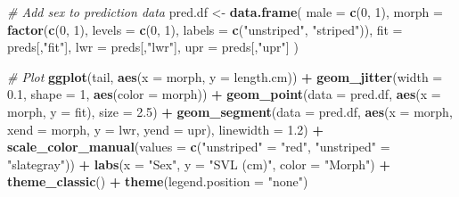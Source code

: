 \documentclass[
]{book}
\newenvironment{Shaded}{\begin{snugshade}}{\end{snugshade}}
\newcommand{\AttributeTok}[1]{\textcolor[rgb]{0.13,0.29,0.53}{#1}}
\newcommand{\CommentTok}[1]{\textcolor[rgb]{0.56,0.35,0.01}{\textit{#1}}}
\newcommand{\DecValTok}[1]{\textcolor[rgb]{0.00,0.00,0.81}{#1}}
\newcommand{\FloatTok}[1]{\textcolor[rgb]{0.00,0.00,0.81}{#1}}
\newcommand{\FunctionTok}[1]{\textcolor[rgb]{0.13,0.29,0.53}{\textbf{#1}}}
\newcommand{\NormalTok}[1]{#1}
\newcommand{\OtherTok}[1]{\textcolor[rgb]{0.56,0.35,0.01}{#1}}
\newcommand{\SpecialCharTok}[1]{\textcolor[rgb]{0.81,0.36,0.00}{\textbf{#1}}}
\newcommand{\StringTok}[1]{\textcolor[rgb]{0.31,0.60,0.02}{#1}}
\begin{document}
\begin{Shaded}
\begin{Highlighting}[]
\CommentTok{\# Add sex to prediction data}
\NormalTok{pred.df }\OtherTok{\textless{}{-}} \FunctionTok{data.frame}\NormalTok{(}
  \AttributeTok{male =} \FunctionTok{c}\NormalTok{(}\DecValTok{0}\NormalTok{, }\DecValTok{1}\NormalTok{),}
  \AttributeTok{morph =} \FunctionTok{factor}\NormalTok{(}\FunctionTok{c}\NormalTok{(}\DecValTok{0}\NormalTok{, }\DecValTok{1}\NormalTok{), }\AttributeTok{levels =} \FunctionTok{c}\NormalTok{(}\DecValTok{0}\NormalTok{, }\DecValTok{1}\NormalTok{), }\AttributeTok{labels =} \FunctionTok{c}\NormalTok{(}\StringTok{"unstriped"}\NormalTok{, }\StringTok{"striped"}\NormalTok{)),}
  \AttributeTok{fit =}\NormalTok{ preds[,}\StringTok{"fit"}\NormalTok{],}
  \AttributeTok{lwr =}\NormalTok{ preds[,}\StringTok{"lwr"}\NormalTok{],}
  \AttributeTok{upr =}\NormalTok{ preds[,}\StringTok{"upr"}\NormalTok{]}
\NormalTok{)}

\CommentTok{\# Plot}
\FunctionTok{ggplot}\NormalTok{(tail, }\FunctionTok{aes}\NormalTok{(}\AttributeTok{x =}\NormalTok{ morph, }\AttributeTok{y =}\NormalTok{ length.cm)) }\SpecialCharTok{+}
  \FunctionTok{geom\_jitter}\NormalTok{(}\AttributeTok{width =} \FloatTok{0.1}\NormalTok{, }\AttributeTok{shape =} \DecValTok{1}\NormalTok{, }\FunctionTok{aes}\NormalTok{(}\AttributeTok{color =}\NormalTok{ morph)) }\SpecialCharTok{+}
  \FunctionTok{geom\_point}\NormalTok{(}\AttributeTok{data =}\NormalTok{ pred.df, }\FunctionTok{aes}\NormalTok{(}\AttributeTok{x =}\NormalTok{ morph, }\AttributeTok{y =}\NormalTok{ fit), }\AttributeTok{size =} \FloatTok{2.5}\NormalTok{) }\SpecialCharTok{+}
  \FunctionTok{geom\_segment}\NormalTok{(}\AttributeTok{data =}\NormalTok{ pred.df,}
               \FunctionTok{aes}\NormalTok{(}\AttributeTok{x =}\NormalTok{ morph, }\AttributeTok{xend =}\NormalTok{ morph, }\AttributeTok{y =}\NormalTok{ lwr, }\AttributeTok{yend =}\NormalTok{ upr), }\AttributeTok{linewidth =} \FloatTok{1.2}\NormalTok{) }\SpecialCharTok{+}
  \FunctionTok{scale\_color\_manual}\NormalTok{(}\AttributeTok{values =} \FunctionTok{c}\NormalTok{(}\StringTok{"unstriped"} \OtherTok{=} \StringTok{"red"}\NormalTok{, }\StringTok{"unstriped"} \OtherTok{=} \StringTok{"slategray"}\NormalTok{)) }\SpecialCharTok{+}
  \FunctionTok{labs}\NormalTok{(}\AttributeTok{x =} \StringTok{"Sex"}\NormalTok{, }\AttributeTok{y =} \StringTok{"SVL (cm)"}\NormalTok{, }\AttributeTok{color =} \StringTok{"Morph"}\NormalTok{) }\SpecialCharTok{+}
  \FunctionTok{theme\_classic}\NormalTok{() }\SpecialCharTok{+}
  \FunctionTok{theme}\NormalTok{(}\AttributeTok{legend.position =} \StringTok{"none"}\NormalTok{)}
\end{Highlighting}
\end{Shaded}
\end{document}
